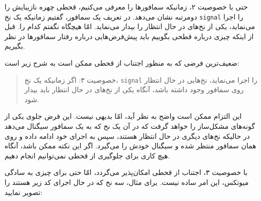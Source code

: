 \documentclass{book}
\begin{document}
    حتی با خصوصیت ۲، زمانیکه سمافورها را معرفی می‌کنیم، قحطی چهره نازیبایش را دومرتبه نشان می‌دهد. 
    در تعریف یک سمافور، گفتیم زمانیکه یک نخ {\tt signal} را اجرا می‌نماید، یکی از نخ‌های در حال انتظار را بیدار می‌نماید. امّا هیچگاه نگفتم کدام را. 
    قبل از اینکه چیزی 
    درباره قطحی بگوییم باید پیش‌فرض‌هایی درباره رفتار سمافورها در نظر بگیریم. 

    ضعیف‌ترین فرضی که به منظور اجتناب از قحطی ممکن است به شرح زیر است:

\begin{quote}
    خصوصیت ۳: اگر زمانیکه یک نخ، {\tt signal} را اجرا می‌نماید، نخ‌هایی در حال انتظار روی سمافور وجود داشته باشد،
    آنگاه یکی از نخ‌های در حال انتظار باید بیدار شود. 
\end{quote}

    این التزام ممکن است واضح به نظر آید، امّا بدیهی نیست. این فرض جلوی یکی از گونه‌های مشکل‌ساز را خواهد گرفت که در آن 
    یک نخ که به یک سمافور سیگنال می‌دهد در حالیکه نخ‌های دیگری در حال انتظار هستند، سپس به اجرای خود ادامه داده و روی همان سمافور منتظر شده و 
    سیگنال خودش را می‌گیرد. اگر این نکته ممکن باشد، آنگاه هیچ کاری برای جلوگیری از قحطی نمی‌توانیم انجام دهیم. 

    با خصوصیت ۳، اجتناب از قحطی امکان‌پذیر می‌گردد، امّا حتی برای چیزی به سادگی میوتکس، این امر ساده نیست. 
    برای مثال، سه نخ که در حال اجرای کد زیر هستند را تصویر نمایید:
    
\end{document}
